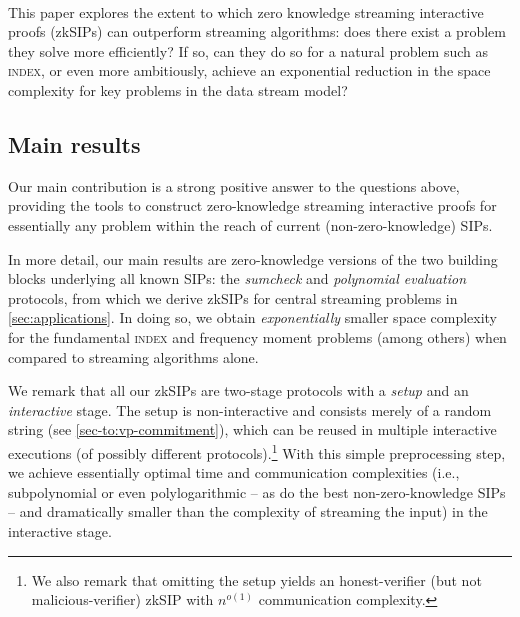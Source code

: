 \documentclass[10pt,a4paper]{article}
\newif\iflipics\lipicsfalse
\theoremstyle{definition}
\newcommand{\zksip}{\textrm{zkSIP}}
\newcommand{\indexproblem}{\normalfont\textsc{index}\xspace}
\begin{document}
\iflipics\else\paragraph*{}\fi This paper explores the extent to which zero knowledge streaming interactive proofs (\zksip{}s) can outperform streaming algorithms: does there exist a problem they solve more efficiently? If so, can they do so for a natural problem such as \indexproblem, or even more ambitiously, achieve an exponential reduction in the space complexity for key problems in the data stream model?



\subsection{Main results}

Our main contribution is a strong positive answer to the questions above, providing the tools to construct zero-knowledge streaming interactive proofs for essentially any problem within the reach of current (non-zero-knowledge) SIPs.

In more detail, our main results are zero-knowledge versions of the two building blocks underlying all known SIPs: the \emph{sumcheck} and \emph{polynomial evaluation} protocols, from which we derive \zksip{}s for central streaming problems in \cref{sec:applications}. In doing so, we obtain \emph{exponentially} smaller space complexity for the fundamental \indexproblem and frequency moment problems (among others) when compared to streaming algorithms alone. %

We remark that all our \zksip{}s are two-stage protocols with a \emph{setup} and an \emph{interactive} stage. The setup is non-interactive and consists merely of a random string (see \cref{sec-to:vp-commitment}), which can be reused in multiple interactive executions (of possibly different protocols).\footnote{We also remark that omitting the setup yields an honest-verifier (but not malicious-verifier) \zksip{} with $n^{o(1)}$ communication complexity.} With this simple preprocessing step, we achieve essentially optimal time and communication complexities (i.e., subpolynomial or even polylogarithmic -- as do the best non-zero-knowledge SIPs -- and dramatically smaller than the complexity of streaming the input) in the interactive stage.
\end{document}
